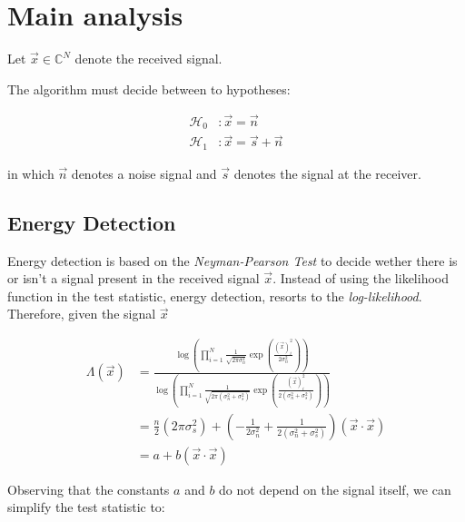 \documentclass[a4paper, openany, oneside]{memoir}
\begin{document}
\section{Main analysis}

Let $\vec{x} \in \mathbb{C}^{N}$ denote the received signal. %

The algorithm must decide between to hypotheses:

\begin{align}\label{eq:hypotheses}
  \mathcal{H}_0&: \vec{x} = \vec{n}\\
  \mathcal{H}_1&: \vec{x} = \vec{s} + \vec{n}
\end{align}

in which $\vec{n}$ denotes a noise signal and $\vec{s}$ denotes the signal
at the receiver. 



\subsection{Energy Detection}
Energy detection is based on the \emph{Neyman-Pearson Test} to decide wether there is or isn't a signal present in the received signal $\vec{x}$. Instead of using the likelihood function in the test statistic, energy detection, resorts to the \emph{log-likelihood}. Therefore,  given
the signal $\vec{x}$

\begin{align*}
\Lambda(\vec{x}) &= \frac{\log (\prod_{i=1}^N \frac{1}{\sqrt{2 \pi \sigma_n^2}} \exp ( \frac{(\vec{x})_i^2}{2\sigma_n^2}))}{\log (\prod_{i=1}^N \frac{1}{\sqrt{2 \pi (\sigma_n^2+\sigma_s^2)}} \exp ( \frac{(\vec{x})_i^2}{2(\sigma_n^2 + \sigma_s^2)}))} \\
&= \frac{n}{2}(2\pi\sigma_s^2 ) +( -\frac{1}{2\sigma_n^2} + \frac{1}{2(\sigma_n^2 + \sigma^2_s)})(\vec{x} \cdot \vec{x}) \\
&= a + b  (\vec{x} \cdot \vec{x})
\end{align*}

Observing that the constants $a$ and $b$ do not depend on the signal itself, we can simplify the test statistic to:
\end{document}
